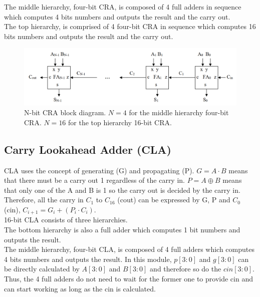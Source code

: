 \documentclass[12pt]{article}
\begin{document}
The middle hierarchy, four-bit CRA, is composed of 4 full adders in sequence which computes 4 bits numbers and outputs the result and the carry out. \\

The top hierarchy, is comprised of 4 four-bit CRA in sequence which computes 16 bits numbers and outputs the result and the carry out.

\begin{figure}[H]
    \centering
    \includegraphics[width=18cm]{N_bit_CRA.png}
    \caption{N-bit CRA block diagram. $N=4$ for the middle hierarchy four-bit CRA. $N=16$ for the top hierarchy 16-bit CRA. \cite{GG4.3}}
\end{figure}

\subsection{Carry Lookahead Adder (CLA)}
CLA uses the concept of generating (G) and propagating (P). $G=A \cdot B$ means that there must be a carry out 1 regardless of the carry in. $P=A \oplus B$ means that only one of the A and B is 1 so the carry out is decided by the carry in. Therefore, all the carry in $C_1$ to $C_16$ (cout) can be expressed by G, P and $C_0$ (cin), $C_{i+1}=G_i+(P_i \cdot C_i)$.\\

16-bit CLA consists of three hierarchies. \\

The bottom hierarchy is also a full adder which computes 1 bit numbers and outputs the result. \\

The middle hierarchy, four-bit CLA, is composed of 4 full adders which computes 4 bits numbers and outputs the result. In this module, $p[3:0]$ and $g[3:0]$ can be directly calculated by $A[3:0]$ and $B[3:0]$ and therefore so do the $cin[3:0]$. Thus, the 4 full adders do not need to wait for the former one to provide cin and can start working as long as the cin is calculated. \\
\end{document}
